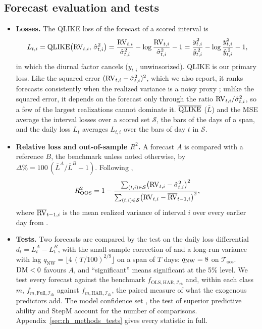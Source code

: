 \subsection{Forecast evaluation and tests}
\label{sec:rh_results_eval}
\begin{itemize}
\item \textbf{Losses.} The QLIKE loss \citep{Patton2011} of the forecast of a scored interval is
  \[
    L_{t,i} = \operatorname{QLIKE}\bigl(\mathrm{RV}_{t,i},\, \hat\sigma^2_{t,i}\bigr)
      = \frac{\mathrm{RV}_{t,i}}{\hat\sigma^2_{t,i}} - \log\frac{\mathrm{RV}_{t,i}}{\hat\sigma^2_{t,i}} - 1
      = \frac{y_{t,i}^2}{\hat y_{t,i}^{\,2}} - \log\frac{y_{t,i}^2}{\hat y_{t,i}^{\,2}} - 1 ,
  \]
  in which the diurnal factor cancels ($y_{t,i}$ unwinsorized). QLIKE is our primary loss. Like the squared error
  $(\mathrm{RV}_{t,i} - \hat\sigma^2_{t,i})^2$, which we also report, it ranks forecasts consistently when the realized
  variance is a noisy proxy \citep{Patton2011}; unlike the squared error, it depends on the forecast only through the
  ratio $\mathrm{RV}_{t,i}/\hat\sigma^2_{t,i}$, so a few of the largest realizations cannot dominate it. $\overline{\operatorname{QLIKE}}$
  ($\bar L$) and the MSE average the interval losses over a scored set $\mathcal S$, the bars of the days of a span,
  and the daily loss $L_t$ averages $L_{t,i}$ over the bars of day $t$ in $\mathcal S$.
\item \textbf{Relative loss and out-of-sample $R^2$.} A forecast $A$ is compared with a reference $B$, the benchmark
  unless noted otherwise, by $\Delta\% = 100\,(\bar L^{A}/\bar L^{B} - 1)$. Following \citet{CampbellThompson2008},
  \[
    R^2_{\mathrm{OOS}} = 1 - \frac{\sum_{(t,i) \in \mathcal S} \bigl(\mathrm{RV}_{t,i} - \hat\sigma^2_{t,i}\bigr)^2}
      {\sum_{(t,i) \in \mathcal S} \bigl(\mathrm{RV}_{t,i} - \overline{\mathrm{RV}}_{t-1,i}\bigr)^2},
  \]
  where $\overline{\mathrm{RV}}_{t-1,i}$ is the mean realized variance of interval $i$ over every earlier day from
  \rhoosBenchStart.
\item \textbf{Tests.} Two forecasts are compared by the \citet{DieboldMariano1995} test on the daily loss differential
  $d_t = L^{A}_t - L^{B}_t$, with the small-sample correction of \citet{HarveyLeybourneNewbold1997} and a
  \citet{NeweyWest1987} long-run variance with lag $q_{\mathrm{NW}} = \lfloor 4\,(T/100)^{2/9} \rfloor$ on a span of
  $T$ days: $q_{\mathrm{NW}} = 8$ on $\mathcal T_{\mathrm{oos}}$. $\mathrm{DM} < 0$ favours $A$, %
  and ``significant'' means significant at the 5\% level. We test
  every forecast against the benchmark $f_{\mathrm{OLS},\mathrm{HAR},\mathcal I_{\mathrm{rh}}}$ and, within each class
  $m$, $f_{m,\mathrm{Full},\mathcal I_{\mathrm{rh}}}$ against $f_{m,\mathrm{HAR},\mathcal I_{\mathrm{rh}}}$, the
  paired measure of what the exogenous predictors add. The model confidence set \citep{HansenLundeNason2011}, the
  test of superior predictive ability \citep{Hansen2005} and StepM \citep{RomanoWolf2005} account for the number of
  comparisons. Appendix~\ref{sec:rh_methods_tests} gives every statistic in full.
\end{itemize}

